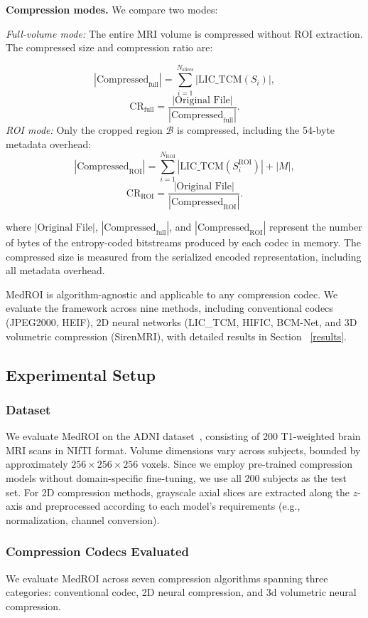 \documentclass[runningheads]{llncs}
\begin{document}
\textbf{Compression modes.} We compare two modes:

\textit{Full-volume mode:} The entire MRI volume is compressed without
ROI extraction. The compressed size and compression ratio are:

$$|\text{Compressed}_{\text{full}}| = \sum_{i=1}^{N_{\text{slices}}} |\text{LIC\_TCM}(S_i)|,$$ $$\text{CR}_{\text{full}} = \frac{|\text{Original File}|} {|\text{Compressed}_{\text{full}}|}.$$ \textit{ROI mode:} Only the cropped region $\mathcal{B}$ is compressed, including the 54-byte metadata overhead: $$|\text{Compressed}_{\text{ROI}}| = \sum_{i=1}^{N_{\text{ROI}}} |\text{LIC\_TCM}(S_i^{\text{ROI}})| + |M|,$$ $$\text{CR}_{\text{ROI}} = \frac{|\text{Original File}|} {|\text{Compressed}_{\text{ROI}}|}.$$


where $|\text{Original File}|$, $|\text{Compressed}_{\text{full}}|$, and $|\text{Compressed}_{\text{ROI}}|$ represent the number of bytes of the entropy-coded bitstreams produced by each codec in memory. The compressed size is measured from the serialized encoded representation, including all metadata overhead.

MedROI is algorithm-agnostic and applicable to any compression codec. 
We evaluate the framework across nine methods, including conventional 
codecs (JPEG2000, HEIF), 2D neural networks (LIC\_TCM, HIFIC, BCM-Net, and 3D volumetric compression (SirenMRI), with detailed 
results in Section~ \ref{results}.

\subsection{Experimental Setup}

\subsubsection{Dataset}
We evaluate MedROI on the ADNI dataset~\cite{ADNI}, consisting of 200 T1-weighted brain MRI scans in NIfTI format. Volume dimensions vary across subjects, bounded by approximately $256 \times 256 \times 256$ voxels. Since we employ pre-trained compression models without domain-specific fine-tuning, we use all 200 subjects as the test set.
For 2D compression methods, grayscale axial slices are extracted along the $z$-axis and preprocessed according to each model's requirements (e.g., normalization, channel conversion).

\subsubsection{Compression Codecs Evaluated}
We evaluate MedROI across seven compression algorithms spanning three categories: conventional codec, 2D neural compression, and 3d volumetric neural compression.
\vspace{+0.1cm}
\end{document}
